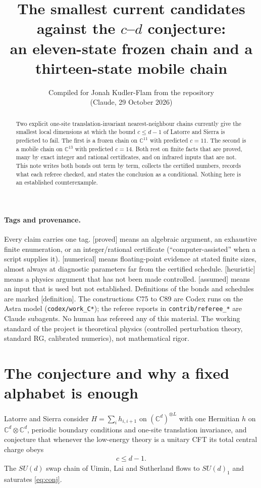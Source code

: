 \documentclass[11pt]{article}
\title{The smallest current candidates against the $c$--$d$ conjecture:\\ an eleven-state frozen chain and a thirteen-state mobile chain}
\author{Compiled for Jonah Kudler-Flam from the \repo{cd\_conjecture} repository\\ (Claude, 29 October 2026)}
\date{}
\newcommand{\tg}[1]{\textsf{[#1]}}
\newcommand{\repo}[1]{\texttt{#1}}
\begin{document}
\maketitle

\begin{abstract}
Two explicit one-site translation-invariant nearest-neighbour chains currently give the smallest local dimensions at which the bound $c\le d-1$ of Latorre and Sierra is predicted to fail. The first is a frozen chain on $\mathbb{C}^{11}$ with predicted $c=11$. The second is a mobile chain on $\mathbb{C}^{13}$ with predicted $c=14$. Both rest on finite facts that are proved, many by exact integer and rational certificates, and on infrared inputs that are not. This note writes both bonds out term by term, collects the certified numbers, records what each referee checked, and states the conclusion as a conditional. Nothing here is an established counterexample.
\end{abstract}

\paragraph{Tags and provenance.} Every claim carries one tag. \tg{proved} means an algebraic argument, an exhaustive finite enumeration, or an integer/rational certificate (``computer-assisted'' when a script supplies it). \tg{numerical} means floating-point evidence at stated finite sizes, almost always at diagnostic parameters far from the certified schedule. \tg{heuristic} means a physics argument that has not been made controlled. \tg{assumed} means an input that is used but not established. Definitions of the bonds and schedules are marked \tg{definition}. The constructions C75 to C89 are Codex runs on the Astra model (\repo{codex/work\_C*}); the referee reports in \repo{contrib/referee\_*} are Claude subagents. No human has refereed any of this material. The working standard of the project is theoretical physics (controlled perturbation theory, standard RG, calibrated numerics), not mathematical rigor.

\section{The conjecture and why a fixed alphabet is enough}

Latorre and Sierra \cite{latorre2024} consider $H=\sum_i h_{i,i+1}$ on $(\mathbb{C}^d)^{\otimes L}$ with one Hermitian $h$ on $\mathbb{C}^d\otimes\mathbb{C}^d$, periodic boundary conditions and one-site translation invariance, and conjecture that whenever the low-energy theory is a unitary CFT its total central charge obeys
\begin{align}
c\le d-1 .\label{eq:conj}
\end{align}
The $SU(d)$ swap chain of Uimin, Lai and Sutherland \cite{sutherland1975} flows to $SU(d)_1$ and saturates \eqref{eq:conj}.
\end{document}
